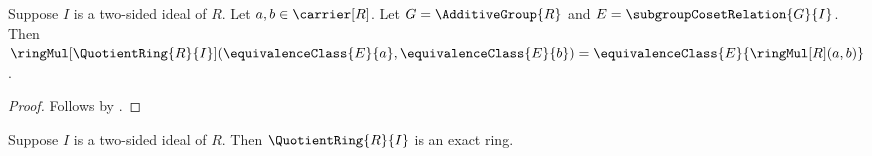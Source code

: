 \begin{proposition}\label{quotient_ring_mul_apply}
    Suppose $I$ is a two-sided ideal of $R$.
    Let $a,b\in\carrier[R]$.
    Let $G=\AdditiveGroup{R}$ and $E=\subgroupCosetRelation{G}{I}$.
    Then
        $\ringMul[\QuotientRing{R}{I}]
            (\equivalenceClass{E}{a},\equivalenceClass{E}{b})
        =\equivalenceClass{E}{\ringMul[R](a,b)}$.
\end{proposition}
\begin{proof}
    Follows by
        .
\end{proof}

\begin{theorem}\label{quotient_ring_is_exact}
    Suppose $I$ is a two-sided ideal of $R$.
    Then $\QuotientRing{R}{I}$ is an exact ring.
\end{theorem}
